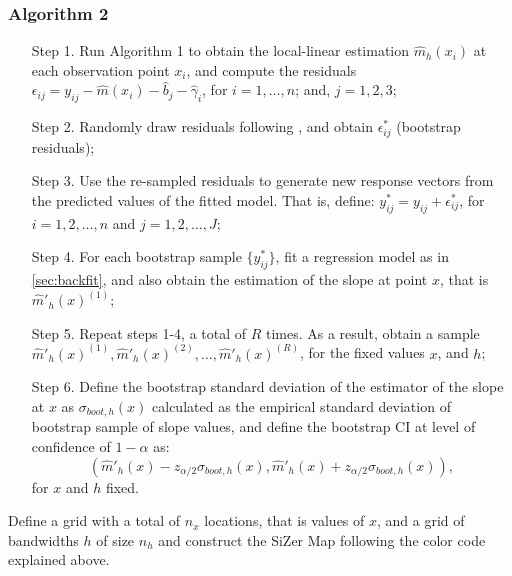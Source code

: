 \documentclass[sn-mathphys]{sn-jnl}%
\theoremstyle{thmstyleone}%
\theoremstyle{thmstyletwo}%
\theoremstyle{thmstylethree}%
\begin{document}
\subsubsection*{Algorithm 2}
\begin{enumerate}
	\item[Step 1.] Run Algorithm 1 to obtain the local-linear estimation $\widehat{m}_h(x_i)$ at each observation point $x_i$, and compute the residuals ${\epsilon}_{ij}=y_{ij}-\widehat{m}(x_i)-\widehat{b}_j-\widehat{\gamma}_i$, for $i =1,\ldots, n$; and, $j=1,2,3$; 
	
	\item[Step 2.] Randomly draw residuals following \cite{MG2015}, and obtain $\epsilon_{ij}^*$ (bootstrap residuals);
	
	\item[Step 3.] Use the re-sampled residuals to generate new response vectors from the predicted values of the fitted model. That is, define: $y_{ij}^*=y_{ij}+\epsilon_{ij}^*$, for $i=1,2,\ldots, n$ and $j=1,2,\ldots, J$;
	
	\item[Step 4.] For each bootstrap sample $\{y_{ij}^*\}$, fit a regression model as in \ref{sec:backfit}, and also obtain the estimation of the slope at point $x$, that is $\widehat{m}'_h(x)^{(1)}$;
	
	\item[Step 5.] Repeat steps 1-4, a total of $R$ times. As a result, obtain a sample $\widehat{m}'_{h}(x)^{(1)}, \widehat{m}'_{h}(x)^{(2)},\ldots, \widehat{m}'_{h}(x)^{(R)}$, for the fixed values $x$, and $h$;
	
	\item[Step 6.] Define the bootstrap standard deviation of the estimator of the slope at $x$ as  $\sigma_{boot,h}(x)$ calculated as the empirical standard deviation of bootstrap sample of slope values, and define the bootstrap CI at level of confidence of $1-\alpha$ as:
	\[
	\left(\widehat{m}'_h(x) -z_{\alpha/2} \sigma_{boot,h}(x), \widehat{m}'_h(x) +z_{\alpha/2} \sigma_{boot,h}(x)\right),
	\]
	for $x$ and $h$ fixed.
\end{enumerate}

Define a grid with a total of $n_x$ locations, that is values of $x$, and a grid of bandwidths $h$ of size $n_h$ and construct the SiZer Map following the color code explained above.
\end{document}
